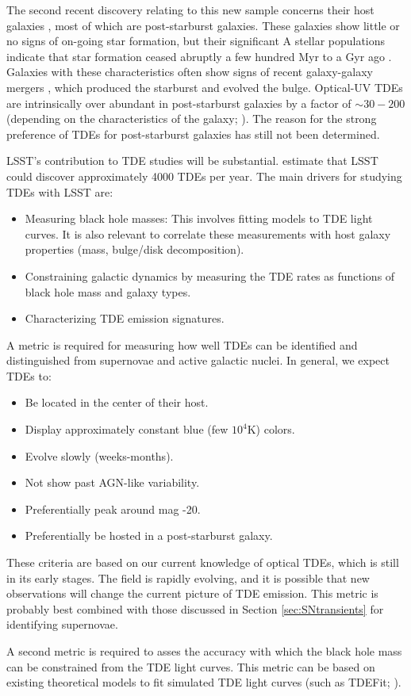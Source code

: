 The second recent discovery relating to this new sample concerns their
host galaxies \citep{Arcavi2014; French2016}, most of which are
post-starburst galaxies. These galaxies show little or no signs of on-going star formation, but their significant A stellar populations indicate that star formation ceased abruptly a few hundred Myr to a Gyr ago \citep{Dressler1983}. Galaxies with these characteristics often show signs of recent galaxy-galaxy mergers \citep{Zabludoff1996}, which produced the starburst and evolved the bulge. Optical-UV TDEs are intrinsically over abundant in post-starburst galaxies by a factor of $\sim30-200$ (depending on the characteristics of the galaxy; \citealt{French et al. 2016}). The reason for the strong preference of TDEs for post-starburst galaxies has still not been determined.

LSST's contribution to TDE studies will be substantial. \citet{VanVelzen2011} estimate that LSST could discover approximately 4000 TDEs per year. The main drivers for studying TDEs with LSST are:
\begin{itemize}
\item Measuring black hole masses: This involves fitting models to TDE light curves. It is also relevant to correlate these measurements with host galaxy properties (mass, bulge/disk decomposition). 
\item Constraining galactic dynamics by measuring the TDE rates as functions of black hole mass and galaxy types. 
\item Characterizing TDE emission signatures. 
\end{itemize}

A metric is required for measuring how well TDEs can be identified and distinguished from supernovae and active galactic nuclei. In general, we expect TDEs to:
\begin{itemize}
\item Be located in the center of their host.
\item Display approximately constant blue (few $10^4$K) colors.
\item Evolve slowly (weeks-months).
\item Not show past AGN-like variability.
\item Preferentially peak around mag -20.
\item Preferentially be hosted in a post-starburst galaxy.
\end{itemize}
These criteria are based on our current knowledge of optical TDEs, which is still in its early stages. The field is rapidly evolving, and it is possible that new observations will change the current picture of TDE emission. 
This metric is probably best combined with those discussed in Section \ref{sec:SNtransients} for identifying supernovae.

A second metric is required to asses the accuracy with which the black hole mass can be constrained from the TDE light curves. This metric can be based on existing theoretical models to fit simulated TDE light curves (such as TDEFit; \citealt{Guillochon2014}). 


